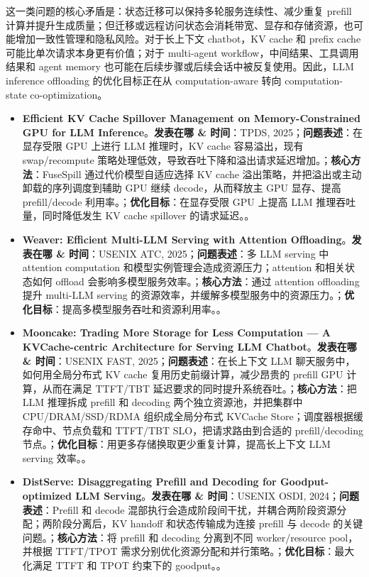 \documentclass[a4paper,twocolumn,10pt]{ctexart}
\begin{document}
这一类问题的核心矛盾是：状态迁移可以保持多轮服务连续性、减少重复 prefill 计算并提升生成质量；但迁移或远程访问状态会消耗带宽、显存和存储资源，也可能增加一致性管理和隐私风险。对于长上下文 chatbot，KV cache 和 prefix cache 可能比单次请求本身更有价值；对于 multi-agent workflow，中间结果、工具调用结果和 agent memory 也可能在后续步骤或后续会话中被反复使用。因此，LLM inference offloading 的优化目标正在从 computation-aware 转向 computation-state co-optimization。



\begin{itemize}
\item \textbf{Efficient KV Cache Spillover Management on Memory-Constrained GPU for LLM Inference}。\textbf{发表在哪 \& 时间}：TPDS, 2025；\textbf{问题表述}：在显存受限 GPU 上进行 LLM 推理时，KV cache 容易溢出，现有 swap/recompute 策略处理低效，导致吞吐下降和溢出请求延迟增加。；\textbf{核心方法}：FuseSpill 通过代价模型自适应选择 KV cache 溢出策略，并把溢出或主动卸载的序列调度到辅助 GPU 继续 decode，从而释放主 GPU 显存、提高 prefill/decode 利用率。；\textbf{优化目标}：在显存受限 GPU 上提高 LLM 推理吞吐量，同时降低发生 KV cache spillover 的请求延迟。。
\item \textbf{Weaver: Efficient Multi-LLM Serving with Attention Offloading}。\textbf{发表在哪 \& 时间}：USENIX ATC, 2025；\textbf{问题表述}：多 LLM serving 中 attention computation 和模型实例管理会造成资源压力；attention 和相关状态如何 offload 会影响多模型服务效率。；\textbf{核心方法}：通过 attention offloading 提升 multi-LLM serving 的资源效率，并缓解多模型服务中的资源压力。；\textbf{优化目标}：提高多模型服务吞吐和资源利用率。。
\item \textbf{Mooncake: Trading More Storage for Less Computation — A KVCache-centric Architecture for Serving LLM Chatbot}。\textbf{发表在哪 \& 时间}：USENIX FAST, 2025；\textbf{问题表述}：在长上下文 LLM 聊天服务中，如何用全局分布式 KV cache 复用历史前缀计算，减少昂贵的 prefill GPU 计算，从而在满足 TTFT/TBT 延迟要求的同时提升系统吞吐。；\textbf{核心方法}：把 LLM 推理拆成 prefill 和 decoding 两个独立资源池，并把集群中 CPU/DRAM/SSD/RDMA 组织成全局分布式 KVCache Store；调度器根据缓存命中、节点负载和 TTFT/TBT SLO，把请求路由到合适的 prefill/decoding 节点。；\textbf{优化目标}：用更多存储换取更少重复计算，提高长上下文 LLM serving 效率。。
\item \textbf{DistServe: Disaggregating Prefill and Decoding for Goodput-optimized LLM Serving}。\textbf{发表在哪 \& 时间}：USENIX OSDI, 2024；\textbf{问题表述}：Prefill 和 decode 混部执行会造成阶段间干扰，并耦合两阶段资源分配；两阶段分离后，KV handoff 和状态传输成为连接 prefill 与 decode 的关键问题。；\textbf{核心方法}：将 prefill 和 decoding 分离到不同 worker/resource pool，并根据 TTFT/TPOT 需求分别优化资源分配和并行策略。；\textbf{优化目标}：最大化满足 TTFT 和 TPOT 约束下的 goodput。。

\end{itemize}
\end{document}
